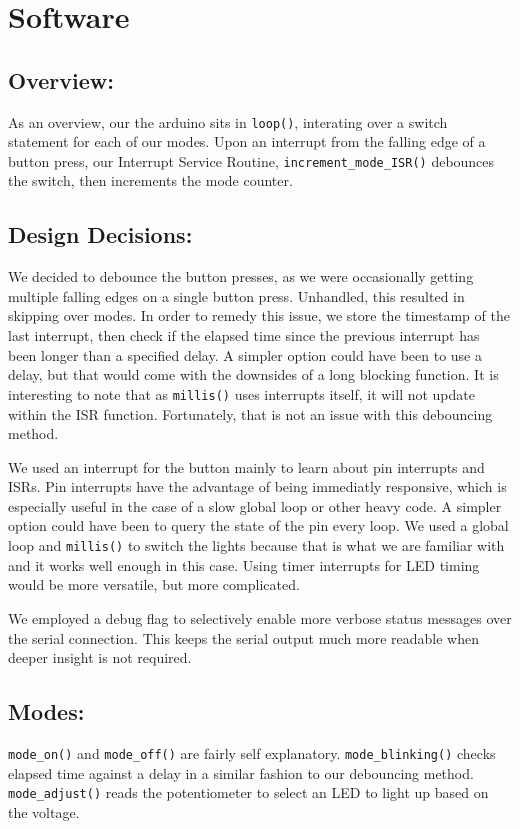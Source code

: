 \documentclass{article}
\begin{document}
\section{Software}

\subsection{Overview:}
As an overview, our the arduino sits in \lstinline{loop()}, interating over a switch statement for each of our modes. Upon an interrupt from the falling edge of a button press, our Interrupt Service Routine, \lstinline{increment_mode_ISR()} debounces the switch, then increments the mode counter.

\subsection{Design Decisions:}
We decided to debounce the button presses, as we were occasionally getting multiple falling edges on a single button press. Unhandled, this resulted in skipping over modes. In order to remedy this issue, we store the timestamp of the last interrupt, then check if the elapsed time since the previous interrupt has been longer than a specified delay. A simpler option could have been to use a delay, but that would come with the downsides of a long blocking function. It is interesting to note that as \lstinline{millis()} uses interrupts itself, it will not update within the ISR function. Fortunately, that is not an issue with this debouncing method.

We used an interrupt for the button mainly to learn about pin interrupts and ISRs. Pin interrupts have the advantage of being immediatly responsive, which is especially useful in the case of a slow global loop or other heavy code. A simpler option could have been to query the state of the pin every loop. We used a global loop and \lstinline{millis()} to switch the lights because that is what we are familiar with and it works well enough in this case. Using timer interrupts for LED timing would be more versatile, but more complicated.

We employed a debug flag to selectively enable more verbose status messages over the serial connection. This keeps the serial output much more readable when deeper insight is not required.

\subsection{Modes:}
\lstinline{mode_on()} and \lstinline{mode_off()} are fairly self explanatory. \lstinline{mode_blinking()} checks elapsed time against a delay in a similar fashion to our debouncing method. \lstinline{mode_adjust()} reads the potentiometer to select an LED to light up based on the voltage.
\end{document}
